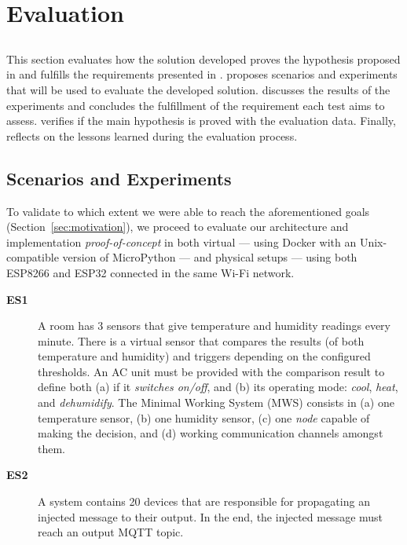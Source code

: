 \chapter{Evaluation} \label{chap:evaluation}

\section*{}

\minitoc \mtcskip \noindent
This section evaluates how the solution developed proves the hypothesis proposed in  and fulfills the requirements presented in .  proposes scenarios and experiments that will be used to evaluate the developed solution.  discusses the results of the experiments and concludes the fulfillment of the requirement each test aims to assess.  verifies if the main hypothesis is proved with the evaluation data. Finally,  reflects on the lessons learned during the evaluation process. 

\section{Scenarios and Experiments}\label{sec:scenarios_experiments}

To validate to which extent we were able to reach the aforementioned goals (\cf Section~\ref{sec:motivation}), we proceed to evaluate our architecture and implementation \textit{proof-of-concept} in both virtual --- using Docker with an Unix-compatible version of MicroPython --- and physical setups --- using both ESP8266 and ESP32 connected in the same Wi-Fi network.

\begin{description}
    \item[\textbf{ES1}] A room has 3 sensors that give temperature and humidity readings every minute. There is a virtual sensor that compares the results (of both temperature and humidity) and triggers depending on the configured thresholds. An AC unit must be provided with the comparison result to define both (a) if it \textit{switches on/off}, and (b) its operating mode: \textit{cool}, \textit{heat}, and \textit{dehumidify}. The Minimal Working System (MWS) consists in (a) one temperature sensor, (b) one humidity sensor, (c) one \textit{node} capable of making the decision, and (d) working communication channels amongst them.
    \item[\textbf{ES2}] A system contains 20 devices that are responsible for propagating an injected message to their output. In the end, the injected message must reach an output MQTT topic.
\end{description}

